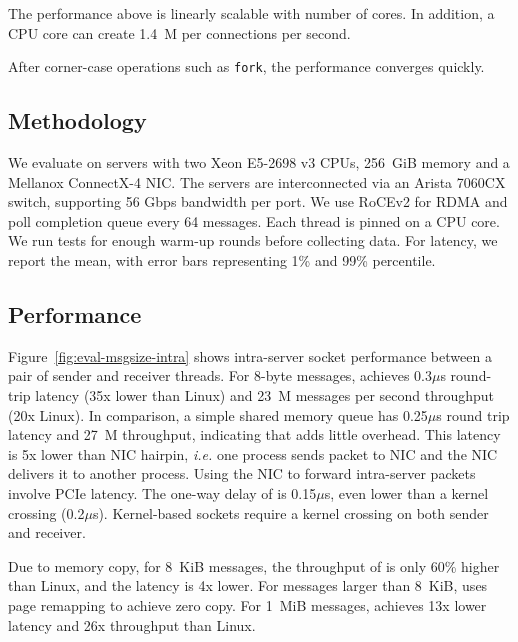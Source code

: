 The performance above is linearly scalable with number of cores. In addition, a CPU core can create 1.4~M per connections per second.

After corner-case operations such as \texttt{fork}, the performance converges quickly.




\subsection{Methodology}
\label{subsec:methodology}

We evaluate \sys on servers with two Xeon E5-2698 v3 CPUs, 256~GiB memory and a Mellanox ConnectX-4 NIC. The servers are interconnected via an Arista 7060CX switch, supporting 56 Gbps bandwidth per port. We use RoCEv2 for RDMA and poll completion queue every 64 messages.
Each thread is pinned on a CPU core. We run tests for enough warm-up rounds before collecting data. For latency, we report the mean, with error bars representing 1\% and 99\% percentile.

\subsection{Performance}



Figure~\ref{fig:eval-msgsize-intra} shows intra-server socket performance between a pair of sender and receiver threads.
For 8-byte messages, \sys achieves 0.3$\mu$s round-trip latency (35x lower than Linux) and 23~M messages per second throughput (20x Linux).
In comparison, a simple shared memory queue has 0.25$\mu$s round trip latency and 27~M throughput, indicating that \sys adds little overhead.
This latency is 5x lower than NIC hairpin, \textit{i.e.} one process sends packet to NIC and the NIC delivers it to another process. Using the NIC to forward intra-server packets involve PCIe latency.
The one-way delay of \sys is 0.15$\mu$s, even lower than a kernel crossing (0.2$\mu$s). Kernel-based sockets require a kernel crossing on both sender and receiver.

Due to memory copy, for 8~KiB messages, the throughput of \sys is only 60\% higher than Linux, and the latency is 4x lower. For messages larger than 8~KiB, \sys uses page remapping to achieve zero copy. For 1~MiB messages, \sys achieves 13x lower latency and 26x throughput than Linux.


